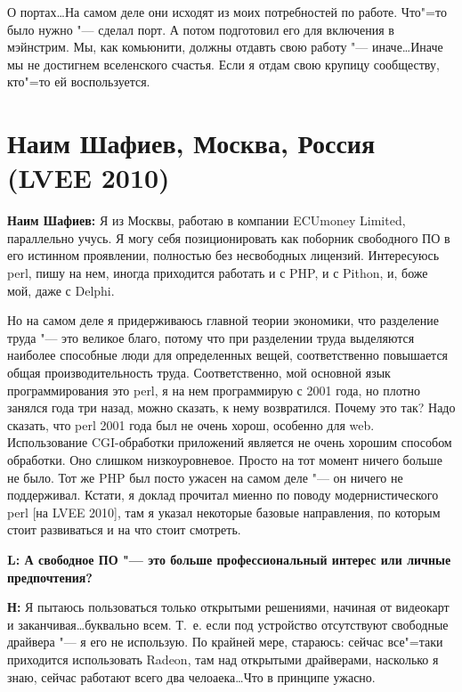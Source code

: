 \documentclass[10pt, a5paper]{article}
\begin{document}
О портах\ldots На самом деле они исходят из моих потребностей по работе. Что"=то было нужно "--- сделал порт. А потом подготовил его для включения в мэйнстрим. Мы, как комьюнити, должны отдавть свою работу "--- иначе\ldots Иначе мы не достигнем вселенского счастья. Если я отдам свою крупицу сообществу, кто"=то ей воспользуется.

\section{Наим Шафиев, Москва, Россия (LVEE 2010)}


{\noindent \bf Наим Шафиев:} Я из Москвы, работаю в компании ECUmoney Limited, параллельно учусь. Я могу себя позиционировать как поборник свободного ПО в его истинном проявлении, полностью без несвободных лицензий. Интересуюсь perl, пишу на нем, иногда приходится работать и с PHP, и с Pithon, и, боже мой, даже с Delphi. 

Но на самом деле я придерживаюсь главной теории экономики, что разделение труда "--- это великое благо, потому что при разделении труда выделяются наиболее способные люди для определенных вещей, соответственно повышается общая производительность труда. Соответственно, мой основной язык программирования это perl, я на нем программирую с 2001 года, но плотно занялся года три назад, можно сказать, к нему возвратился. Почему это так? Надо сказать, что perl 2001 года был не очень хорош, особенно для web. Использование CGI-обработки приложений является не очень хорошим способом обработки. Оно слишком низкоуровневое. Просто на тот момент ничего больше не было. Тот же PHP был посто ужасен на самом деле "--- он ничего не поддерживал. Кстати, я доклад прочитал миенно по поводу модернистического perl [на LVEE 2010], там я указал некоторые базовые направления, по которым стоит развиваться и на что стоит смотреть.

{\noindent \bf L: А свободное ПО "--- это больше профессиональный интерес или личные предпочтения?}

{\noindent \bf Н:} Я пытаюсь пользоваться только открытыми решениями, начиная от видеокарт и заканчивая\ldots буквально всем. Т.~е. если под устройство отсутствуют свободные драйвера "--- я его не использую. По крайней мере, стараюсь: сейчас все"=таки приходится использовать Radeon, там над открытыми драйверами, насколько я знаю, сейчас работают всего два челоаека\ldots Что в принципе ужасно. 
\end{document}
